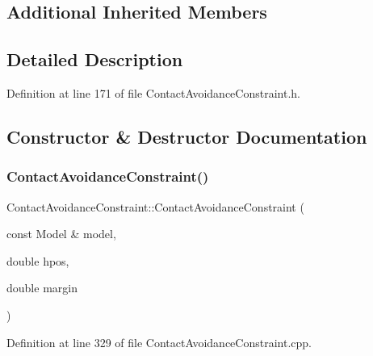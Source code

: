 \subsection*{Additional Inherited Members}


\subsection{Detailed Description}


Definition at line 171 of file Contact\+Avoidance\+Constraint.\+h.



\subsection{Constructor \& Destructor Documentation}
\hypertarget{classocra_1_1ContactAvoidanceConstraint_a77ef6f814bddd8ff8eabb9cf1272b4a3}{}\label{classocra_1_1ContactAvoidanceConstraint_a77ef6f814bddd8ff8eabb9cf1272b4a3} 
\subsubsection{\texorpdfstring{Contact\+Avoidance\+Constraint()}{ContactAvoidanceConstraint()}}
{\footnotesize\ttfamily Contact\+Avoidance\+Constraint\+::\+Contact\+Avoidance\+Constraint (\begin{DoxyParamCaption}\item[{const Model \&}]{model,  }\item[{double}]{hpos,  }\item[{double}]{margin }\end{DoxyParamCaption})}



Definition at line 329 of file Contact\+Avoidance\+Constraint.\+cpp.

\hypertarget{classocra_1_1ContactAvoidanceConstraint_a57650df61143b936321c20d582f2457f}{}\label{classocra_1_1ContactAvoidanceConstraint_a57650df61143b936321c20d582f2457f} 
